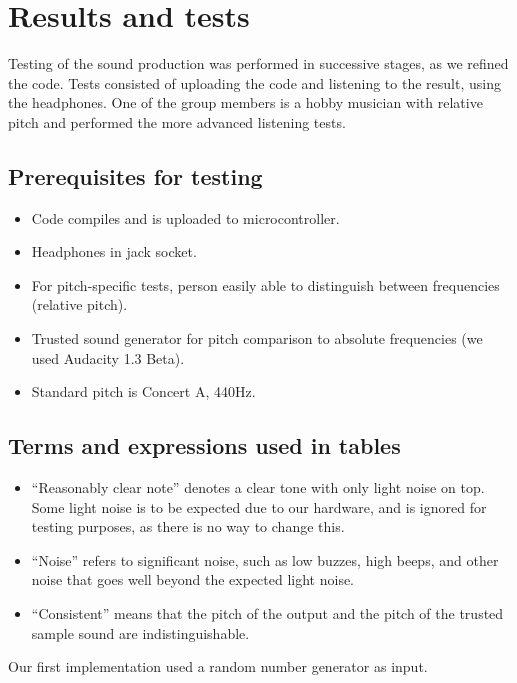 \section{Results and tests}

Testing of the sound production was performed in successive stages, as
we refined the code. Tests consisted of uploading the code and listening
to the result, using the headphones. One of the group members is a hobby
musician with relative pitch and performed the more advanced listening
tests.

\subsection*{Prerequisites for testing}
\begin{itemize}
\item Code compiles and is uploaded to microcontroller.
\item Headphones in jack socket.
\item For pitch-specific tests, person easily able to distinguish between frequencies (relative pitch).
\item Trusted sound generator for pitch comparison to absolute frequencies (we used Audacity 1.3 Beta).
\item Standard pitch is Concert A, 440Hz.
\end{itemize}

\subsection*{Terms and expressions used in tables}
\begin{itemize}
\item ``Reasonably clear note'' denotes a clear tone with only light
noise on top. Some light noise is to be expected due to our hardware,
and is ignored for testing purposes, as there is no way to change this.
\item ``Noise'' refers to significant noise, such as low buzzes, high
beeps, and other noise that goes well beyond the expected light noise.
\item ``Consistent'' means that the pitch of the output and the
pitch of the trusted sample sound are indistinguishable.
\end{itemize}

Our first implementation used a random number generator as input.
